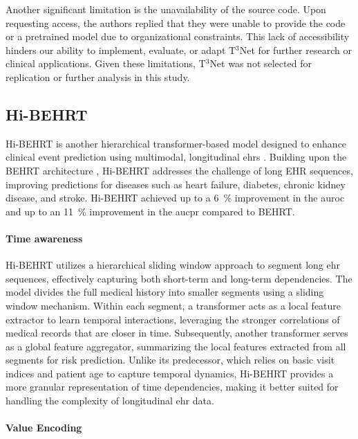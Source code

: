 Another significant limitation is the unavailability of the source code. Upon requesting access, the authors replied that they were unable to provide the code or a pretrained model due to organizational constraints. This lack of accessibility hinders our ability to implement, evaluate, or adapt T$^3$Net for further research or clinical applications. Given these limitations, T$^3$Net was not selected for replication or further analysis in this study.


\subsection{Hi-BEHRT}

Hi-BEHRT is another hierarchical transformer-based model designed to enhance clinical event prediction using multimodal, longitudinal \glspl{ehr} \cite{HiBEHRT2023}. Building upon the BEHRT architecture \cite{BEHRT2020}, Hi-BEHRT addresses the challenge of long EHR sequences, improving predictions for diseases such as heart failure, diabetes, chronic kidney disease, and stroke. Hi-BEHRT achieved up to a \qty{6}{\percent} improvement in the \gls{auroc} and up to an \qty{11}{\percent} improvement in the \gls{aucpr} compared to BEHRT.

\paragraph{Time awareness}

Hi-BEHRT utilizes a hierarchical sliding window approach to segment long \gls{ehr} sequences, effectively capturing both short-term and long-term dependencies. The model divides the full medical history into smaller segments using a sliding window mechanism. Within each segment, a transformer acts as a local feature extractor to learn temporal interactions, leveraging the stronger correlations of medical records that are closer in time. Subsequently, another transformer serves as a global feature aggregator, summarizing the local features extracted from all segments for risk prediction. Unlike its predecessor, which relies on basic visit indices and patient age to capture temporal dynamics, Hi-BEHRT provides a more granular representation of time dependencies, making it better suited for handling the complexity of longitudinal \gls{ehr} data.


\paragraph{Value Encoding}

